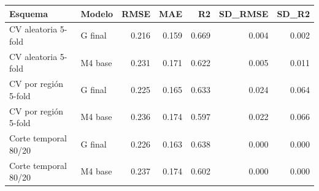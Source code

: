 \begin{tabular}{llrrrrr}
\toprule
Esquema & Modelo & RMSE & MAE & R2 & SD\_RMSE & SD\_R2 \\
\midrule
CV aleatoria 5-fold & G final & 0.216 & 0.159 & 0.669 & 0.004 & 0.002 \\
CV aleatoria 5-fold & M4 base & 0.231 & 0.171 & 0.622 & 0.005 & 0.011 \\
CV por región 5-fold & G final & 0.225 & 0.165 & 0.633 & 0.024 & 0.064 \\
CV por región 5-fold & M4 base & 0.236 & 0.174 & 0.597 & 0.022 & 0.066 \\
Corte temporal 80/20 & G final & 0.226 & 0.163 & 0.638 & 0.000 & 0.000 \\
Corte temporal 80/20 & M4 base & 0.237 & 0.174 & 0.602 & 0.000 & 0.000 \\
\bottomrule
\end{tabular}
